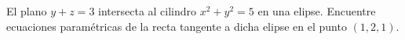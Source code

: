 \item El plano $y + z = 3$ intersecta al cilindro $x^2 + y^2 = 5$ en una elipse. Encuentre ecuaciones paramétricas de la recta tangente a dicha elipse en el punto $(1, 2, 1)$.
